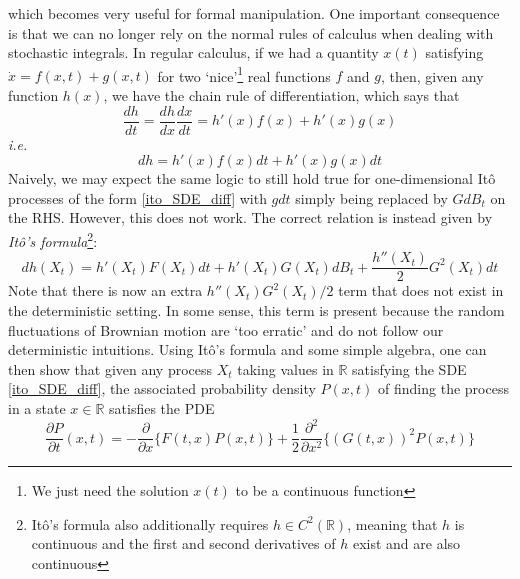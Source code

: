 which becomes very useful for formal manipulation. One important consequence is that we can no longer rely on the normal rules of calculus when dealing with stochastic integrals. In regular calculus, if we had a quantity $x(t)$ satisfying $\dot{x} = f(x,t) + g(x,t)$ for two `nice'\footnote{We just need the solution $x(t)$ to be a continuous function} real functions $f$ and $g$, then, given any function $h(x)$, we have the chain rule of differentiation, which says that
\begin{equation*}
\frac{dh}{dt} = \frac{dh}{dx}\frac{dx}{dt} = h'(x)f(x) + h'(x)g(x)
\end{equation*}
\emph{i.e.}
\begin{equation*}
	dh =  h'(x)f(x)dt + h'(x)g(x)dt
\end{equation*}
Naively, we may expect the same logic to still hold true for one-dimensional It\^o processes of the form \eqref{ito_SDE_diff} with $gdt$ simply being replaced by $GdB_t$ on the RHS. However, this does not work. The correct relation is instead given by 
\emph{It\^o's formula}\footnote{It\^o's formula also additionally requires $h \in C^2(\mathbb{R})$, meaning that $h$ is continuous and the first and second derivatives of $h$ exist and are also continuous}:
\begin{equation*}
dh(X_t) = h'(X_t)F(X_t)dt + h'(X_t)G(X_t)dB_t  + \frac{h''(X_t)}{2}G^2(X_t)dt 
\end{equation*}
Note that there is now an extra $h''(X_t)G^2(X_t)/2$ term that does not exist in the deterministic setting. In some sense, this term is present because the random fluctuations of Brownian motion are `too erratic' and do not follow our deterministic intuitions. Using It\^o's formula and some simple algebra, one can then show that given any process $X_t$ taking values in $\mathbb{R}$ satisfying the SDE \eqref{ito_SDE_diff}, the associated probability density $P(x,t)$ of finding the process in a state $x \in \mathbb{R}$ satisfies the PDE
\begin{equation}
\label{ito_FPE}
\frac{\partial P}{\partial t}(x,t) = -\frac{\partial}{\partial x}\{F(t,x)P(x,t)\} + \frac{1}{2}\frac{\partial^2}{\partial x^2}\{(G(t,x))^2P(x,t)\}
\end{equation}
